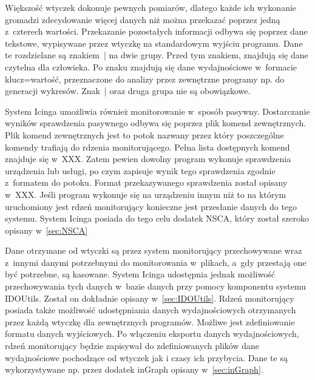 Większość wtyczek dokonuje pewnych pomiarów, dlatego każde ich
wykonanie gromadzi zdecydowanie więcej danych niż można przekazać
poprzez jedną z~czterech wartości. Przekazanie pozostałych informacji
odbywa się poprzez dane tekstowe, wypisywane przez wtyczkę na
standardowym wyjściu programu. Dane te rozdzielane są znakiem~| na dwie
grupy. Przed tym znakiem, znajdują się dane czytelna dla człowieka. Po
znaku znajdują się dane wydajnościowe w~formacie klucz=wartość,
przeznaczone do analizy przez zewnętrzne programy np. do generacji
wykresów. Znak~| oraz druga grupa nie są obowiązkowe.

System Icinga umożliwia również monitorowanie w~sposób
pasywny. Dostarczanie wyników sprawdzenia pasywnego odbywa się poprzez
plik komend zewnętrznych. Plik komend zewnętrznych jest to potok
nazwany przez który poszczególne komendy trafiają do rdzenia
monitorującego. Pełna lista dostępnych komend znajduje się
w~XXX. Zatem pewien dowolny program wykonuje sprawdzenia urządzenia
lub usługi, po czym zapisuje wynik tego sprawdzenia zgodnie z~formatem
do potoku. Format przekazywanego sprawdzenia został opisany
w~XXX. Jeśli program wykonuje się na urządzeniu innym niż to na którym
uruchomiony jest rdzeń monitorujący konieczne jest przesłanie danych
do tego systemu. System Icinga posiada do tego celu dodatek NSCA,
który został szeroko opisany w~\ref{sec:NSCA}

Dane otrzymane od wtyczki są przez system monitorujący przechowywane
wraz z~innymi danymi potrzebnymi do monitorowania w~plikach, a~gdy
przestają one być potrzebne, są kasowane. System Icinga udostępnia
jednak możliwość przechowywania tych danych w~bazie danych przy pomocy
komponentu systemu IDOUtils. Został on dokładnie opisany
w~\ref{sec:IDOUtils}. Rdzeń monitorujący posiada także możliwość
udostępniania danych wydajnościowych otrzymanych przez każdą wtyczkę
dla zewnętrznych programów. Możliwe jest zdefiniowanie formatu danych
wyjściowych. Po włączeniu eksportu danych wydajnościowych, rdzeń
monitorujący będzie zapisywał do zdefiniowanych plików dane
wydajnościowe pochodzące od wtyczek jak i czasy ich przybycia. Dane te
są wykorzystywane np. przez dodatek inGraph opisany
w~\ref{sec:inGraph}.

